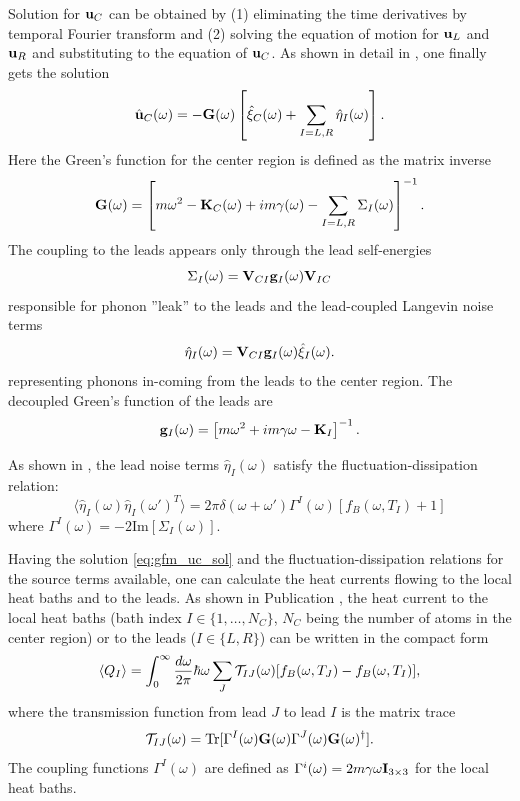 Solution for $\mathbf{u}_C$ can be obtained by (1) eliminating the time derivatives by temporal Fourier transform and (2) solving the equation of motion for $\mathbf{u}_L$ and $\mathbf{u}_R$ and substituting to the equation of $\mathbf{u}_C$. As shown in detail in , one finally gets the solution
\begin{equation}
 \hat{\mathbf{u}}_C(\omega) = - \mathbf{G}(\omega) \left[ \hat\xi_C(\omega) + \sum_{I=L,R} \hat{\eta}_I(\omega) \right]. \label{eq:gfm_uc_sol}
\end{equation}
Here the Green's function for the center region is defined as the matrix inverse
\begin{equation}
 \mathbf{G}(\omega) = \left[m\omega^2 - \mathbf{K}_C(\omega) +im\gamma(\omega) - \sum_{I=L,R} \Sigma_I(\omega)  \right]^{-1}.
\end{equation}
The coupling to the leads appears only through the lead self-energies
\begin{equation}
 \Sigma_I(\omega) = \mathbf{V}_{CI} \mathbf{g}_I(\omega) \mathbf{V}_{IC} 
\end{equation}
responsible for phonon ''leak'' to the leads and the lead-coupled Langevin noise terms
\begin{equation}
 \hat\eta_I(\omega) = \mathbf{V}_{CI}\mathbf{g}_I(\omega) \hat{\xi}_I(\omega).
\end{equation}
representing phonons in-coming from the leads to the center region. The decoupled Green's function of the leads are
\begin{equation}
 \mathbf{g}_I(\omega) = \left[m\omega^2+im\gamma\omega - \mathbf{K}_I \right]^{-1}.
\end{equation}

As shown in , the lead noise terms $\hat\eta_I(\omega)$ satisfy the fluctuation-dissipation relation:
\begin{equation}
 \langle \hat\eta_I(\omega) \hat\eta_I(\omega')^T \rangle=2\pi\delta(\omega+\omega') \Gamma^I(\omega) \left[f_B(\omega,T_I)+1 \right]
\end{equation}
where $\Gamma^I(\omega)=-2\textrm{Im}[\Sigma_I(\omega)]$.

Having the solution \eqref{eq:gfm_uc_sol} and the fluctuation-dissipation relations for the source terms available, one can calculate the heat currents flowing to the local heat baths and to the leads. As shown in Publication , the heat current to the local heat baths (bath index $I\in \{1,\dots,N_C\}$, $N_C$ being the number of atoms in the center region) or to the leads ($I \in \{L,R\}$) can be written in the compact form
\begin{equation}
 \langle Q_I \rangle =  \int_0^{\infty} \frac{d\omega}{2\pi} \hbar \omega \sum_{J} \mathcal{T}_{IJ}(\omega)[f_B(\omega,T_J)-f_B(\omega,T_I)], \label{eq:gfm_qi}
\end{equation}
where the transmission function from lead $J$ to lead $I$ is the matrix trace 
\begin{equation}
 \mathcal{T}_{IJ}(\omega) = \textrm{Tr}[\Gamma^I(\omega) \mathbf{G}(\omega) \Gamma^J(\omega) \mathbf{G}(\omega)^{\dagger}]. \label{eq:gfm_caroli}
\end{equation}
The coupling functions $\Gamma^I(\omega)$ are defined as $\Gamma^i(\omega)=2m\gamma\omega \mathbf{I}_{3\times3}$ for the local heat baths.

